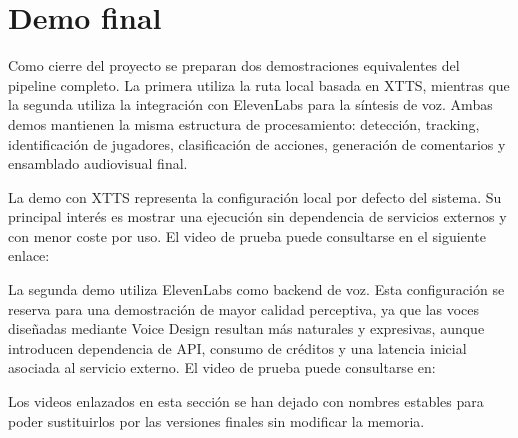 \section{Demo final}
\label{sec:demo-final}

Como cierre del proyecto se preparan dos demostraciones equivalentes del pipeline completo. La primera utiliza la ruta local basada en XTTS, mientras que la segunda utiliza la integración con ElevenLabs para la síntesis de voz. Ambas demos mantienen la misma estructura de procesamiento: detección, tracking, identificación de jugadores, clasificación de acciones, generación de comentarios y ensamblado audiovisual final.

La demo con XTTS representa la configuración local por defecto del sistema. Su principal interés es mostrar una ejecución sin dependencia de servicios externos y con menor coste por uso. El video de prueba puede consultarse en el siguiente enlace:

\begin{center}
\end{center}

La segunda demo utiliza ElevenLabs como backend de voz. Esta configuración se reserva para una demostración de mayor calidad perceptiva, ya que las voces diseñadas mediante Voice Design resultan más naturales y expresivas, aunque introducen dependencia de API, consumo de créditos y una latencia inicial asociada al servicio externo. El video de prueba puede consultarse en:

\begin{center}
\end{center}

Los videos enlazados en esta sección se han dejado con nombres estables para poder sustituirlos por las versiones finales sin modificar la memoria.

